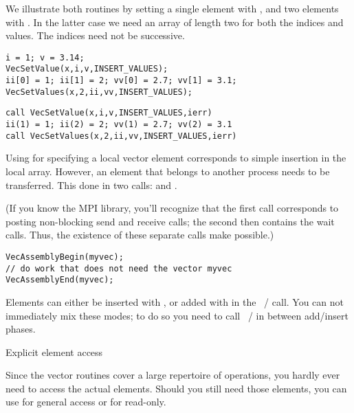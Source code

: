 We illustrate both routines by setting a single element with ,
and two elements with . In the latter case
we need an array of length two for both the indices and values. The indices need
not be successive.

\lstset{language=C}
\begin{lstlisting}
i = 1; v = 3.14;
VecSetValue(x,i,v,INSERT_VALUES);
ii[0] = 1; ii[1] = 2; vv[0] = 2.7; vv[1] = 3.1;
VecSetValues(x,2,ii,vv,INSERT_VALUES);
\end{lstlisting}

\lstset{language=Fortran}
\begin{lstlisting}
call VecSetValue(x,i,v,INSERT_VALUES,ierr)
ii(1) = 1; ii(2) = 2; vv(1) = 2.7; vv(2) = 3.1
call VecSetValues(x,2,ii,vv,INSERT_VALUES,ierr)
\end{lstlisting}
\lstset{language=C}

Using  for specifying a local vector element
corresponds to simple insertion in the local array. However,
an element that belongs to another process needs to be
transferred. This done in two calls: 
and .


(If you know the MPI library, you'll recognize that the first call corresponds to
posting non-blocking send and receive calls; the second then contains
the wait calls. Thus, the existence of these separate calls make
 possible.)

\begin{lstlisting}
VecAssemblyBegin(myvec);
// do work that does not need the vector myvec
VecAssemblyEnd(myvec);
\end{lstlisting}

Elements can either be inserted
with ,
or added with  in the
~/  call.
You can not immediately mix these modes; to do so you need to call
~/ 
in between add/insert phases.

 {Explicit element access}

Since the vector routines cover a large repertoire of operations, you
hardly ever need to access the actual elements. Should you still need
those elements, you can use  for general
access or  for read-only.

